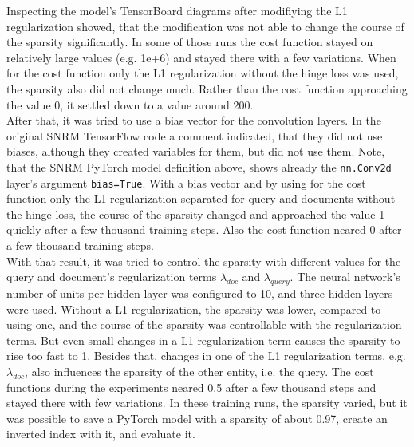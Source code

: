 Inspecting the model's TensorBoard diagrams after modifiying the L1 regularization showed,
    that the modification was not able to change the course of the sparsity significantly.
In some of those runs the cost function stayed on relatively large values (e.g. 1e+6)
    and stayed there with a few variations.
When for the cost function only the L1 regularization without the hinge loss was used,
    the sparsity also did not change much.
Rather than the cost function approaching the value 0, it settled down to a value
    around 200.\\
After that, it was tried to use a bias vector for the convolution layers.
In the original SNRM TensorFlow code a comment indicated, that they did not use biases,
    although they created variables for them, but did not use them.
Note, that the SNRM PyTorch model definition above, shows already the \texttt{nn.Conv2d} 
    layer's argument \texttt{bias=True}.
With a bias vector and by using for the cost function only the L1 regularization separated 
    for query and documents without the hinge loss,
    the course of the sparsity changed and approached the value 1 quickly after a few thousand 
    training steps.
Also the cost function neared 0 after a few thousand training steps.\\
With that result, it was tried to control the sparsity with different values for 
    the query and document's regularization terms $\lambda_{doc}$ and $\lambda_{query}$.
The neural network's number of units per hidden layer was configured to 10, and three 
    hidden layers were used.
Without a L1 regularization, the sparsity was lower, compared to using one,
    and the course of the sparsity was controllable with the regularization terms.
But even small changes in a L1 regularization term causes the sparsity to rise too fast to 1.
Besides that, changes in one of the L1 regularization terms, e.g. $\lambda_{doc}$,
    also influences the sparsity of the other entity, i.e. the query.
The cost functions during the experiments neared 0.5 after a few thousand steps and stayed 
    there with few variations.
In these training runs, the sparsity varied, but it was possible to save a PyTorch model    
    with a sparsity of about 0.97, create an inverted index with it, and evaluate it.
